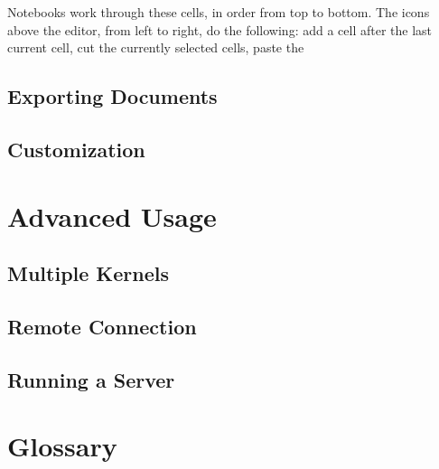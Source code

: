 \documentclass[pdftex,12pt]{artikel3}
\begin{document}
Notebooks work through these cells, in order from top to bottom. The icons above the editor, from left to right, do the following: add a cell after the last current cell, cut the currently selected cells, paste the 

\subsection{Exporting Documents}

\subsection{Customization}

\section{Advanced Usage}


\subsection{Multiple Kernels}

\subsection{Remote Connection}


\subsection{Running a Server}


\newpage

\section{Glossary}
\end{document}
